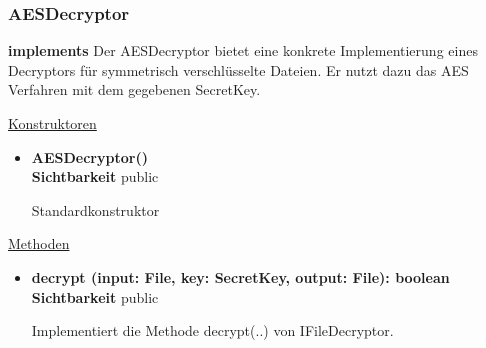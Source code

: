 \subsubsection{AESDecryptor} \label{service:klasse:AESDecryptor}
\textbf{implements}  \newline
Der AESDecryptor bietet eine konkrete Implementierung eines  Decryptors für symmetrisch verschlüsselte Dateien. Er nutzt dazu das AES Verfahren mit dem gegebenen SecretKey. \newline

\underline{Konstruktoren}
\begin{itemize}
\itemsep0pt
\item \textbf{AESDecryptor()} \hfill\\
\textbf{Sichtbarkeit} public

Standardkonstruktor
\end{itemize}

\underline{Methoden}
\begin{itemize}
\itemsep0pt
\item \textbf{decrypt (input: File, key: SecretKey, output: File): boolean}\hfill\\
\textbf{Sichtbarkeit} public

Implementiert die Methode decrypt(..) von IFileDecryptor.

\end{itemize}